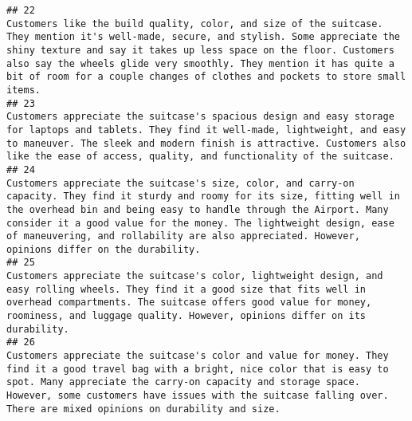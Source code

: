 \documentclass[
]{article}
\begin{document}
\begin{verbatim}
## 22                                                                                                                                                                                                                                                           Customers like the build quality, color, and size of the suitcase. They mention it's well-made, secure, and stylish. Some appreciate the shiny texture and say it takes up less space on the floor. Customers also say the wheels glide very smoothly. They mention it has quite a bit of room for a couple changes of clothes and pockets to store small items.
## 23                                                                                                                                                                                                                                                                                                                                    Customers appreciate the suitcase's spacious design and easy storage for laptops and tablets. They find it well-made, lightweight, and easy to maneuver. The sleek and modern finish is attractive. Customers also like the ease of access, quality, and functionality of the suitcase.
## 24                                                                                                                                                                                                                                             Customers appreciate the suitcase's size, color, and carry-on capacity. They find it sturdy and roomy for its size, fitting well in the overhead bin and being easy to handle through the Airport. Many consider it a good value for the money. The lightweight design, ease of maneuvering, and rollability are also appreciated. However, opinions differ on the durability.
## 25                                                                                                                                                                                                                                                                                                                                            Customers appreciate the suitcase's color, lightweight design, and easy rolling wheels. They find it a good size that fits well in overhead compartments. The suitcase offers good value for money, roominess, and luggage quality. However, opinions differ on its durability.
## 26                                                                                                                                                                                                                                                                                                Customers appreciate the suitcase's color and value for money. They find it a good travel bag with a bright, nice color that is easy to spot. Many appreciate the carry-on capacity and storage space. However, some customers have issues with the suitcase falling over. There are mixed opinions on durability and size.

\end{verbatim}
\end{document}
